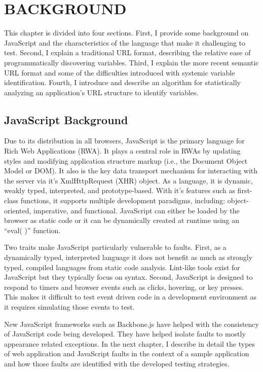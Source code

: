 \chapter{\uppercase{BACKGROUND}}

This chapter is divided into four sections.  First, I provide some background on JavaScript and the characteristics of the language that make it challenging to test.  Second, I explain a traditional URL format, describing the relative ease of programmatically discovering variables.  Third, I explain the more recent semantic URL format and some of the difficulties introduced with systemic variable identification.  Fourth, I introduce and describe an algorithm for statistically analyzing an application's URL structure to identify variables.

\section{JavaScript Background}
Due to its distribution in all browsers, JavaScript is the primary language for Rich Web Applications (RWA).  It plays a central role in RWAs by updating styles and modifying application structure markup (i.e., the Document Object Model or DOM).  It also is the key data transport mechanism for interacting with the server via it's XmlHttpRequest (XHR) object.  As a language, it is dynamic, weakly typed, interpreted, and prototype-based.  With it's features such as first-class functions, it supports multiple development paradigms, including: object-oriented, imperative, and functional.  JavaScript can either be loaded by the browser as static code or it can be dynamically created at runtime using an ``eval( )'' function.  

Two traits make JavaScript particularly vulnerable to faults.  First, as a dynamically typed, interpreted language it does not benefit as much as strongly typed, compiled languages from static code analysis.  Lint-like tools exist for JavaScript but they typically focus on syntax.  Second, JavaScript is designed to respond to timers and browser events such as clicks, hovering, or key presses.  This makes it difficult to test event driven code in a development environment as it requires simulating those events to test.

New JavaScript frameworks such as Backbone.js have helped with the consistency of JavaScript code being developed.  They have helped isolate faults to mostly appearance related exceptions.  In the next chapter, I describe in detail the types of web application and JavaScript faults in the context of a sample application and how those faults are identified with the developed testing strategies.

